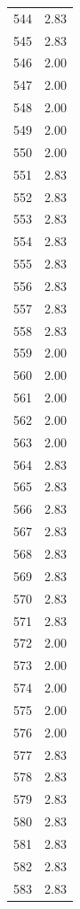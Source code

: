 \documentclass[a4paper,11pt]{article}
\begin{document}
\begin{center}
\begin{longtable}{|R{1.5cm}|R{2.5cm}|}
  544  &         2.83 \\ 
  545  &         2.83 \\ 
  546  &         2.00 \\ 
  547  &         2.00 \\ 
  548  &         2.00 \\ 
  549  &         2.00 \\ 
  550  &         2.00 \\ 
  551  &         2.83 \\ 
  552  &         2.83 \\ 
  553  &         2.83 \\ 
  554  &         2.83 \\ 
  555  &         2.83 \\ 
  556  &         2.83 \\ 
  557  &         2.83 \\ 
  558  &         2.83 \\ 
  559  &         2.00 \\ 
  560  &         2.00 \\ 
  561  &         2.00 \\ 
  562  &         2.00 \\ 
  563  &         2.00 \\ 
  564  &         2.83 \\ 
  565  &         2.83 \\ 
  566  &         2.83 \\ 
  567  &         2.83 \\ 
  568  &         2.83 \\ 
  569  &         2.83 \\ 
  570  &         2.83 \\ 
  571  &         2.83 \\ 
  572  &         2.00 \\ 
  573  &         2.00 \\ 
  574  &         2.00 \\ 
  575  &         2.00 \\ 
  576  &         2.00 \\ 
  577  &         2.83 \\ 
  578  &         2.83 \\ 
  579  &         2.83 \\ 
  580  &         2.83 \\ 
  581  &         2.83 \\ 
  582  &         2.83 \\ 
  583  &         2.83 \\ 

\end{longtable}
\end{center}
\end{document}
